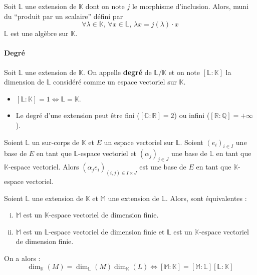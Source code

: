 	\begin{proposition}
		Soit $\mathbb{L}$ une extension de $\mathbb{K}$ dont on note $j$ le morphisme d'inclusion. Alors, muni du ``produit par un scalaire'' défini par
		\[ \forall \lambda \in \mathbb{K}, \, \forall x \in \mathbb{L}, \, \lambda x = j(\lambda) \cdot x \]
		$\mathbb{L}$ est une algèbre sur $\mathbb{K}$.
	\end{proposition}
	
	\paragraph{Degré}
	
	\begin{definition}
		Soit $\mathbb{L}$ une extension de $\mathbb{K}$. On appelle \textbf{degré} de $\mathbb{L}/\mathbb{K}$ et on note $[\mathbb{L}:\mathbb{K}]$ la dimension de $\mathbb{L}$ considéré comme un espace vectoriel sur $\mathbb{K}$.
	\end{definition}
	
	\begin{remark}
		\begin{itemize}
			\item $[\mathbb{L}:\mathbb{K}] = 1 \iff \mathbb{L} = \mathbb{K}$.
			\item Le degré d'une extension peut être fini ($[\mathbb{C}:\mathbb{R}] = 2$) ou infini ($[\mathbb{R}:\mathbb{Q}] = +\infty$).
		\end{itemize}
	\end{remark}
	
	\begin{theorem}
		Soient $\mathbb{L}$ un sur-corps de $\mathbb{K}$ et $E$ un espace vectoriel sur $\mathbb{L}$.
		Soient $(e_i)_{i \in I}$ une base de $E$ en tant que $\mathbb{L}$-espace vectoriel et $(\alpha_j)_{j \in J}$ une base de $\mathbb{L}$ en tant que $\mathbb{K}$-espace vectoriel.
		\newpar
		Alors $(\alpha_j e_i)_{(i,j) \in I \times J}$ est une base de $E$ en tant que $\mathbb{K}$-espace vectoriel.
	\end{theorem}
	
	\begin{corollary}
		Soient $\mathbb{L}$ une extension de $\mathbb{K}$ et $\mathbb{M}$ une extension de $\mathbb{L}$. Alors, sont équivalentes :
		\begin{enumerate}[(i)]
			\item $\mathbb{M}$ est un $\mathbb{K}$-espace vectoriel de dimension finie.
			\item $\mathbb{M}$ est un $\mathbb{L}$-espace vectoriel de dimension finie et $\mathbb{L}$ est un $\mathbb{K}$-espace vectoriel de dimension finie.
		\end{enumerate}
		On a alors :
		\[ \dim_{\mathbb{K}}(M) = \dim_{\mathbb{L}}(M) \dim_{\mathbb{K}}(L) \iff [\mathbb{M}:\mathbb{K}] = [\mathbb{M}:\mathbb{L}] [\mathbb{L}:\mathbb{K}] \]
	\end{corollary}
	
